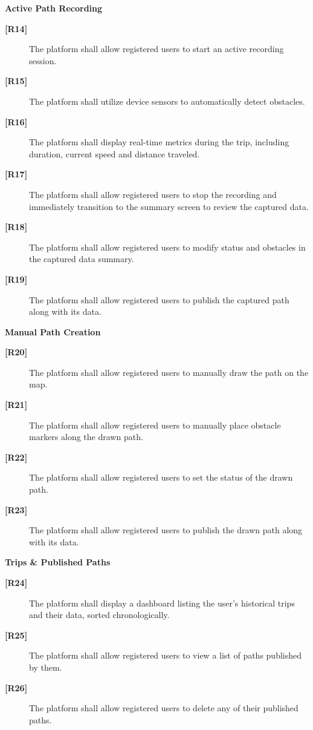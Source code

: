 \noindent
\textbf{Active Path Recording}
\begin{description}
    \item[\textbf{[R14]}] The platform shall allow registered users to start an active recording session.
    \item[\textbf{[R15]}] The platform shall utilize device sensors to automatically detect obstacles.
    \item[\textbf{[R16]}] The platform shall display real-time metrics during the trip, including duration, current speed and distance traveled.

    \item[\textbf{[R17]}] The platform shall allow registered users to stop the recording and immediately transition to the summary screen to review the captured data.

    \item[\textbf{[R18]}] The platform shall allow registered users to modify status and obstacles in the captured data summary.

    \item[\textbf{[R19]}] The platform shall allow registered users to publish the captured path along with its data.
\end{description}

\newpage
\noindent
\textbf{Manual Path Creation}
\begin{description}
    \item[\textbf{[R20]}] The platform shall allow registered users to manually draw the path on the map.
    \item[\textbf{[R21]}] The platform shall allow registered users to manually place obstacle markers along the drawn path.
    \item[\textbf{[R22]}] The platform shall allow registered users to set the status of the drawn path.
    \item[\textbf{[R23]}] The platform shall allow registered users to publish the drawn path along with its data.
\end{description}

\noindent
\textbf{Trips \& Published Paths}
\begin{description}
    \item[\textbf{[R24]}] The platform shall display a dashboard listing the user's historical trips and their data, sorted chronologically.
    \item[\textbf{[R25]}] The platform shall allow registered users to view a list of paths published by them.
    \item[\textbf{[R26]}] The platform shall allow registered users to delete any of their published paths.
\end{description}

